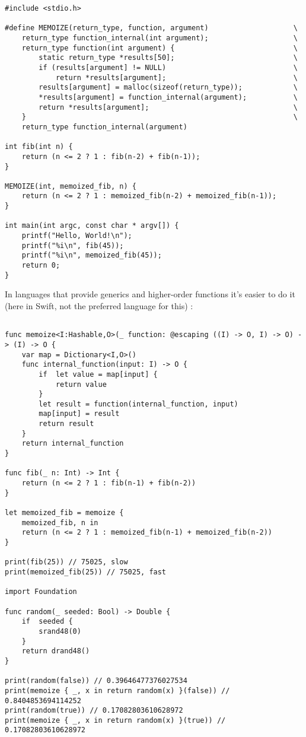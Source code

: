 \documentclass[]{article}
\begin{document}
\begin{lstlisting}[frame=single,style=base]
#include <stdio.h>

#define MEMOIZE(return_type, function, argument)                    \
    return_type function_internal(int argument);                    \
    return_type function(int argument) {                            \
        static return_type *results[50];                            \
        if (results[argument] != NULL)                              \
            return *results[argument];                              \
        results[argument] = malloc(sizeof(return_type));            \
        *results[argument] = function_internal(argument);           \
        return *results[argument];                                  \
    }                                                               \
    return_type function_internal(argument)

int fib(int n) {
    return (n <= 2 ? 1 : fib(n-2) + fib(n-1));
}

MEMOIZE(int, memoized_fib, n) {
    return (n <= 2 ? 1 : memoized_fib(n-2) + memoized_fib(n-1));
}

int main(int argc, const char * argv[]) {
    printf("Hello, World!\n");
    printf("%i\n", fib(45));
    printf("%i\n", memoized_fib(45));
    return 0;
}
\end{lstlisting}

\noindent In languages that provide generics and higher-order functions it's easier to do it (here in Swift, not the preferred language for this) :

\begin{lstlisting}[frame=single]

func memoize<I:Hashable,O>(_ function: @escaping ((I) -> O, I) -> O) -> (I) -> O {
    var map = Dictionary<I,O>()
    func internal_function(input: I) -> O {
        if  let value = map[input] {
            return value
        }
        let result = function(internal_function, input)
        map[input] = result
        return result
    }
    return internal_function
}

func fib(_ n: Int) -> Int {
    return (n <= 2 ? 1 : fib(n-1) + fib(n-2))
}

let memoized_fib = memoize {
    memoized_fib, n in
    return (n <= 2 ? 1 : memoized_fib(n-1) + memoized_fib(n-2))
}

print(fib(25)) // 75025, slow
print(memoized_fib(25)) // 75025, fast

import Foundation

func random(_ seeded: Bool) -> Double {
    if  seeded {
        srand48(0)
    }
    return drand48()
}

print(random(false)) // 0.39646477376027534
print(memoize { _, x in return random(x) }(false)) // 0.8404853694114252
print(random(true)) // 0.17082803610628972
print(memoize { _, x in return random(x) }(true)) // 0.17082803610628972
\end{lstlisting}
\end{document}
